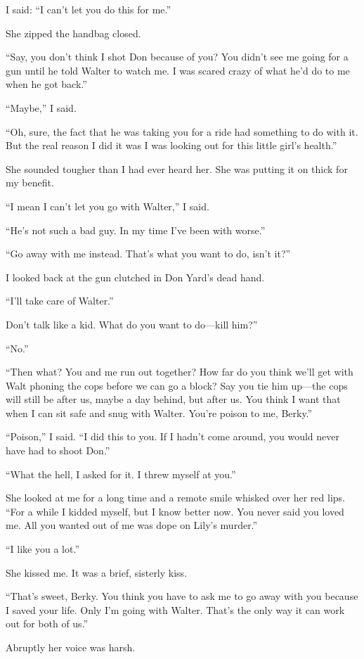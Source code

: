 \documentclass{novel}
\begin{document}
I said: “I can’t let you do this for me.”

She zipped the handbag closed.

“Say, you don’t think I shot Don because of you? You didn’t see me going for a gun until he told Walter to watch me. I was scared crazy of what he’d do to me when he got back.”

“Maybe,” I said.

“Oh, sure, the fact that he was taking you for a ride had something to do with it. But the real reason I did it was I was looking out for this little girl’s health.”

She sounded tougher than I had ever heard her. She was putting it on thick for my benefit.

“I mean I can’t let you go with Walter,” I said.

“He’s not such a bad guy. In my time I’ve been with worse.”

“Go away with me instead. That’s what you want to do, isn’t it?”

I looked back at the gun clutched in Don Yard’s dead hand.

“I’ll take care of Walter.”

Don’t talk like a kid. What do you want to do—kill him?”

“No.”

“Then what? You and me run out together? How far do you think we’ll get with Walt phoning the cops before we can go a block? Say you tie him up—the cops will still be after us, maybe a day behind, but after us. You think I want that when I can sit safe and snug with Walter. You’re poison to me, Berky.”

“Poison,” I said. “I did this to you. If I hadn’t come around, you would never have had to shoot Don.”

“What the hell, I asked for it. I threw myself at you.” 

She looked at me for a long time and a remote smile whisked over her red lips. “For a while I kidded myself, but I know better now. You never said you loved me. All you wanted out of me was dope on Lily’s murder.”

“I like you a lot.”

She kissed me. It was a brief, sisterly kiss.

“That’s sweet, Berky. You think you have to ask me to go away with you because I saved your life. Only I’m going with Walter. That’s the only way it can work out for both of us.”

Abruptly her voice was harsh.
\end{document}
